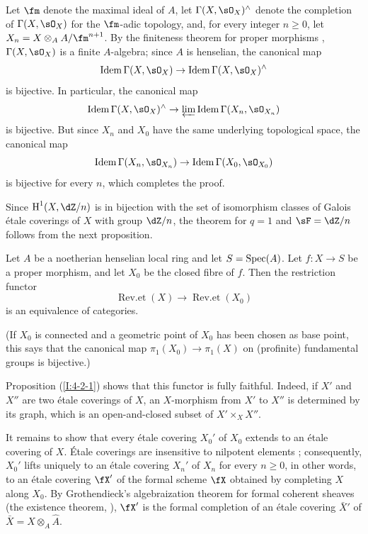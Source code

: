 Let $\fm$ denote the maximal ideal of $A$, let
$\Gamma(X,\sO_X)^\wedge$ denote the completion of $\Gamma(X,\sO_X)$
for the $\fm$-adic topology, and, for every integer $n\geqslant0$, let
$X_n=X\otimes_AA/\fm^{n+1}$. By the finiteness theorem for proper
morphisms \cite[III.3.2]{ega}, $\Gamma(X,\sO_X)$ is a finite
$A$-algebra; since $A$ is henselian, the canonical map
\[
  \operatorname{Idem} \Gamma(X,\sO_X) \to \operatorname{Idem}\Gamma(X,\sO_X)^\wedge
\]
is bijective. In particular, the canonical map
\[
  \operatorname{Idem} \Gamma(X,\sO_X)^\wedge \to \varprojlim \operatorname{Idem}\Gamma(X_n,\sO_{X_n})
\]
is bijective. But since $X_n$ and $X_0$ have the same underlying
topological space, the canonical map
\[
  \operatorname{Idem}\Gamma(X_n,\sO_{X_n}) \to \operatorname{Idem} \Gamma(X_0,\sO_{X_0})
\]
is bijective for every $n$, which completes the proof.

Since $\h^1(X,\dZ/n)$ is in bijection with the set of isomorphism classes
of Galois étale coverings of $X$ with group $\dZ/n$, the theorem for
$q=1$ and $\sF=\dZ/n$ follows from the next proposition.

\begin{proposition}\label{I:4-2-2}
Let $A$ be a noetherian henselian local ring and let $S=\operatorname{Spec}(A)$. Let
$f:X\to S$ be a proper morphism, and let $X_0$ be the closed fibre of $f$. Then
the restriction functor
\[
  \operatorname{Rev.et}(X) \to \operatorname{Rev.et}(X_0)
\]
is an equivalence of categories.
\end{proposition}

(If $X_0$ is connected and a geometric point of $X_0$ has been chosen
as base point, this says that the canonical map
$\pi_1(X_0)\to\pi_1(X)$ on (profinite) fundamental groups is bijective.)

Proposition (\ref{I:4-2-1}) shows that this functor is fully faithful.
Indeed, if $X'$ and $X''$ are two étale coverings of $X$, an
$X$-morphism from $X'$ to $X''$ is determined by its graph, which is an
open-and-closed subset of $X'\times_XX''$.

It remains to show that every étale covering $X_0'$ of $X_0$ extends to
an étale covering of $X$. Étale coverings are insensitive to nilpotent
elements \cite[ch.1]{sga1}; consequently, $X_0'$ lifts uniquely to an
étale covering $X_n'$ of $X_n$ for every $n\geqslant0$, in other words,
to an étale covering $\fX'$ of the formal scheme $\fX$ obtained by
completing $X$ along $X_0$. By Grothendieck's algebraization theorem for
formal coherent sheaves (the existence theorem, \cite[III.5]{ega}),
$\fX'$ is the formal completion of an étale covering $\bar X'$ of
$\bar X=X\otimes_A\hat A$.

